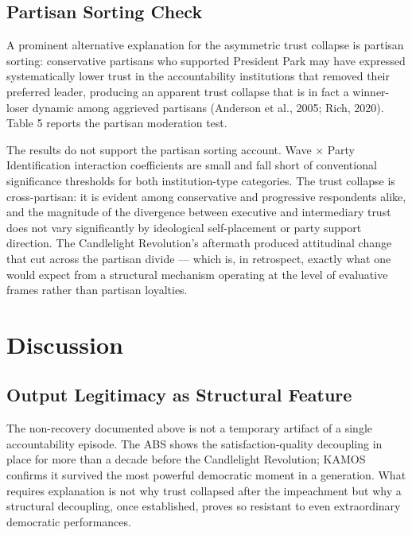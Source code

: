 \documentclass[
  12pt,
  letterpaper]{article}
\begin{document}
\subsection{Partisan Sorting Check}\label{partisan-sorting-check}

A prominent alternative explanation for the asymmetric trust collapse is
partisan sorting: conservative partisans who supported President Park
may have expressed systematically lower trust in the accountability
institutions that removed their preferred leader, producing an apparent
trust collapse that is in fact a winner-loser dynamic among aggrieved
partisans (Anderson et al., 2005; Rich, 2020). Table 5 reports the
partisan moderation test.

The results do not support the partisan sorting account. Wave × Party
Identification interaction coefficients are small and fall short of
conventional significance thresholds for both institution-type
categories. The trust collapse is cross-partisan: it is evident among
conservative and progressive respondents alike, and the magnitude of the
divergence between executive and intermediary trust does not vary
significantly by ideological self-placement or party support direction.
The Candlelight Revolution's aftermath produced attitudinal change that
cut across the partisan divide --- which is, in retrospect, exactly what
one would expect from a structural mechanism operating at the level of
evaluative frames rather than partisan loyalties.

\section{Discussion}\label{discussion}

\subsection{Output Legitimacy as Structural
Feature}\label{output-legitimacy-as-structural-feature}

The non-recovery documented above is not a temporary artifact of a
single accountability episode. The ABS shows the satisfaction-quality
decoupling in place for more than a decade before the Candlelight
Revolution; KAMOS confirms it survived the most powerful democratic
moment in a generation. What requires explanation is not why trust
collapsed after the impeachment but why a structural decoupling, once
established, proves so resistant to even extraordinary democratic
performances.
\end{document}
